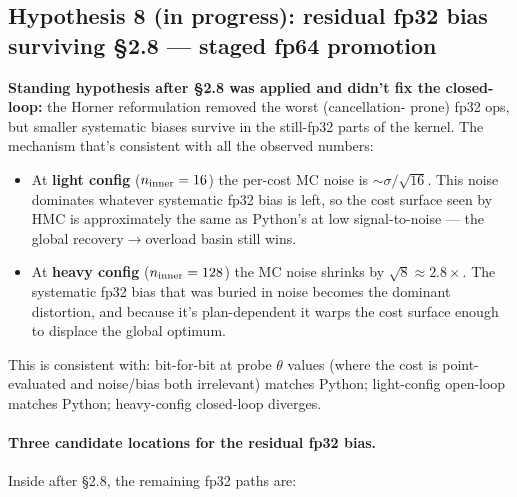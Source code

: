 \documentclass[11pt,a4paper]{article}
\begin{document}
\subsection{Hypothesis 8 (in progress): residual fp32 bias surviving \S2.8 --- staged fp64 promotion}

\textbf{Standing hypothesis after \S2.8 was applied and didn't fix the
closed-loop:} the Horner reformulation removed the worst (cancellation-
prone) fp32 ops, but smaller systematic biases survive in the still-fp32
parts of the kernel. The mechanism that's consistent with all the
observed numbers:

\begin{itemize}[itemsep=2pt]
\item At \textbf{light config} ($n_{\rm inner}=16$) the per-cost MC
  noise is $\sim\sigma/\sqrt{16}$. This noise dominates whatever
  systematic fp32 bias is left, so the cost surface seen by HMC is
  approximately the same as Python's at low signal-to-noise --- the
  global recovery$\to$overload basin still wins.
\item At \textbf{heavy config} ($n_{\rm inner}=128$) the MC noise
  shrinks by $\sqrt{8}\approx 2.8\times$. The systematic fp32 bias
  that was buried in noise becomes the dominant distortion, and
  because it's plan-dependent it warps the cost surface enough to
  displace the global optimum.
\end{itemize}

This is consistent with: bit-for-bit at probe $\theta$ values (where
the cost is point-evaluated and noise/bias both irrelevant) matches
Python; light-config open-loop matches Python; heavy-config closed-loop
diverges.

\paragraph{Three candidate locations for the residual fp32 bias.}
Inside  after \S2.8, the
remaining fp32 paths are:
\end{document}

